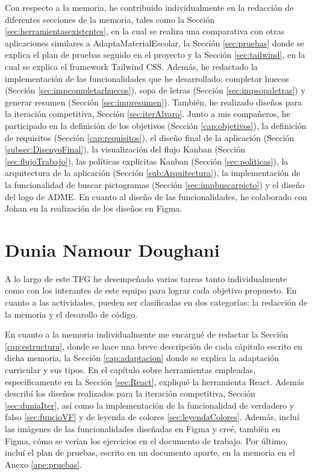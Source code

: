 Con respecto a la memoria, he contribuido individualmente en la redacción de diferentes secciones de la memoria, tales como la Sección \ref{sec:herramientasexistentes}, en la cual se realiza una comparativa con otras aplicaciones similares a AdaptaMaterialEscolar, la Sección \ref{sec:pruebas} donde se explica el plan de pruebas seguido en el proyecto y la Sección \ref{sec:tailwind}, en la cual se explica el framework Tailwind CSS. Además, he redactado la implementación de las funcionalidades que he desarrollado: completar huecos (Sección \ref{sec:impcompletarhuecos}), sopa de letras (Sección \ref{sec:impsopaletras}) y generar resumen (Sección \ref{sec:impresumen}). También, he realizado diseños para la iteración competitiva, Sección \ref{sec:iterAlvaro}. Junto a mis compañeros, he participado en la definición de los objetivos (Sección \ref{cap:objetivos}), la definición de requisitos (Sección \ref{cap:requisitos}), el diseño final de la aplicación (Sección \ref{subsec:DisenyoFinal}), la visualización del flujo Kanban (Sección \ref{sec:flujoTrabajo}), las políticas explicitas Kanban (Sección \ref{sec:politicas}), la arquitectura de la aplicación (Sección \ref{sub:Arquitectura}), la implementación de la funcionalidad de buscar pictogramas (Sección \ref{sec:impbuscarpicto}) y el diseño del logo de ADME. En cuanto al diseño de las funcionalidades, he colaborado con Johan en la realización de los diseños en Figma.

\section{Dunia Namour Doughani}
A lo largo de este TFG he desempeñado varias tareas tanto individualmente como con los interantes de este equipo para lograr cada objetivo propuesto. En cuanto a las actividades, pueden ser clasificadas en dos categorías: la redacción de la memoria y el desarollo de código.

En cuanto a la memoria individualmente me encargué de redactar
la Sección \ref{cap:estructura}, donde se hace una breve descripción de cada cápitulo escrito en dicha memoria, la Sección \ref{cap:adaptacion} donde se explica la adaptación curricular y sus tipos. En el capítulo sobre herramientas empleadas, específicamente en la Sección \ref{sec:React}, expliqué la herramienta React. Además describí los diseños realizados para la iteración competitiva, Sección \ref{sec:duniaIter}, así como la implementación de la funcionalidad de verdadero y falso \ref{sec:funcioVF} y de leyenda de colores \ref{sec:leyendaColores}. Además, incluí las imágenes de las funcionalidades diseñadas en Figma y creé, también en Figma, cómo se verían los ejercicios en el documento de trabajo.
Por último, incluí el plan de pruebas, escrito en un documento aparte, en la memoria en el Anexo \ref{ape:pruebas}.

